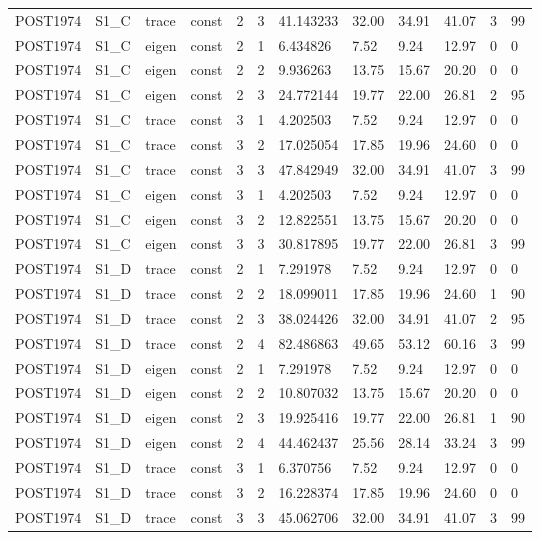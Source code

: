 \begin{tabular}{llllllllllll}
POST1974 & S1\_C & trace & const & 2 & 3 & 41.143233 & 32.00 & 34.91 & 41.07 & 3 & 99 \\
POST1974 & S1\_C & eigen & const & 2 & 1 & 6.434826 & 7.52 & 9.24 & 12.97 & 0 & 0 \\
POST1974 & S1\_C & eigen & const & 2 & 2 & 9.936263 & 13.75 & 15.67 & 20.20 & 0 & 0 \\
POST1974 & S1\_C & eigen & const & 2 & 3 & 24.772144 & 19.77 & 22.00 & 26.81 & 2 & 95 \\
POST1974 & S1\_C & trace & const & 3 & 1 & 4.202503 & 7.52 & 9.24 & 12.97 & 0 & 0 \\
POST1974 & S1\_C & trace & const & 3 & 2 & 17.025054 & 17.85 & 19.96 & 24.60 & 0 & 0 \\
POST1974 & S1\_C & trace & const & 3 & 3 & 47.842949 & 32.00 & 34.91 & 41.07 & 3 & 99 \\
POST1974 & S1\_C & eigen & const & 3 & 1 & 4.202503 & 7.52 & 9.24 & 12.97 & 0 & 0 \\
POST1974 & S1\_C & eigen & const & 3 & 2 & 12.822551 & 13.75 & 15.67 & 20.20 & 0 & 0 \\
POST1974 & S1\_C & eigen & const & 3 & 3 & 30.817895 & 19.77 & 22.00 & 26.81 & 3 & 99 \\
POST1974 & S1\_D & trace & const & 2 & 1 & 7.291978 & 7.52 & 9.24 & 12.97 & 0 & 0 \\
POST1974 & S1\_D & trace & const & 2 & 2 & 18.099011 & 17.85 & 19.96 & 24.60 & 1 & 90 \\
POST1974 & S1\_D & trace & const & 2 & 3 & 38.024426 & 32.00 & 34.91 & 41.07 & 2 & 95 \\
POST1974 & S1\_D & trace & const & 2 & 4 & 82.486863 & 49.65 & 53.12 & 60.16 & 3 & 99 \\
POST1974 & S1\_D & eigen & const & 2 & 1 & 7.291978 & 7.52 & 9.24 & 12.97 & 0 & 0 \\
POST1974 & S1\_D & eigen & const & 2 & 2 & 10.807032 & 13.75 & 15.67 & 20.20 & 0 & 0 \\
POST1974 & S1\_D & eigen & const & 2 & 3 & 19.925416 & 19.77 & 22.00 & 26.81 & 1 & 90 \\
POST1974 & S1\_D & eigen & const & 2 & 4 & 44.462437 & 25.56 & 28.14 & 33.24 & 3 & 99 \\
POST1974 & S1\_D & trace & const & 3 & 1 & 6.370756 & 7.52 & 9.24 & 12.97 & 0 & 0 \\
POST1974 & S1\_D & trace & const & 3 & 2 & 16.228374 & 17.85 & 19.96 & 24.60 & 0 & 0 \\
POST1974 & S1\_D & trace & const & 3 & 3 & 45.062706 & 32.00 & 34.91 & 41.07 & 3 & 99 \\

\end{tabular}
